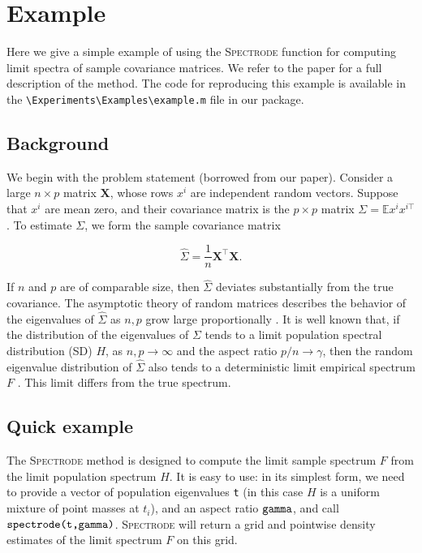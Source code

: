 \documentclass[english,11pt]{article} %
\begin{document}
\section{Example}
\label{example}

Here we give a simple example of using the \textsc{Spectrode} function for computing limit spectra of sample covariance matrices. We refer to the paper \cite{dobriban2015precise} for a full description of the method. The code for reproducing this example is available in the \verb+\Experiments\Examples\example.m+ file in our package. 

\subsection{Background}

We begin with the problem statement (borrowed from our paper). Consider a large $n \times p$ matrix $\mathbf{X}$, whose rows $x^i$ are independent random vectors. Suppose that $x^i$ are mean zero, and their covariance matrix is the $p \times p$ matrix $\Sigma = \mathbb{E}{x^i x^{i\top}}$. To estimate $\Sigma$, we form the sample covariance matrix

$$
\widehat{\Sigma} = \frac{1}{n} \mathbf{X}^\top \mathbf{X}.
$$

If $n$ and $p$ are of comparable size, then $\widehat{\Sigma}$ deviates substantially from the true covariance. The asymptotic theory of random matrices describes the behavior of the eigenvalues of $\widehat{\Sigma}$ as $n,p$ grow large proportionally \citep[e.g.][]{bai2009spectral}. It is well known that, if the distribution of the eigenvalues of $\Sigma$ tends to a limit population spectral distribution (SD) $H$, as $n,p \to \infty$ and the aspect ratio $p/n \to \gamma$, then the random eigenvalue distribution of $\widehat{\Sigma}$ also tends to a deterministic limit empirical spectrum $F$ \citep{marchenko1967distribution,silverstein1995strong}. This limit differs from the true spectrum.

\subsection{Quick example}

The \textsc{Spectrode} method is designed to compute the limit sample spectrum $F$ from the limit population spectrum $H$. It is easy to use: in its simplest form, we need to provide a vector of population eigenvalues \verb+t+ (in this case $H$ is a uniform mixture of point masses at $t_i$), and an aspect ratio $\verb+gamma+$, and call $\verb+spectrode(t,gamma)+$. \textsc{Spectrode} will return a grid and pointwise density estimates of the limit spectrum $F$ on this grid. 
\end{document}
